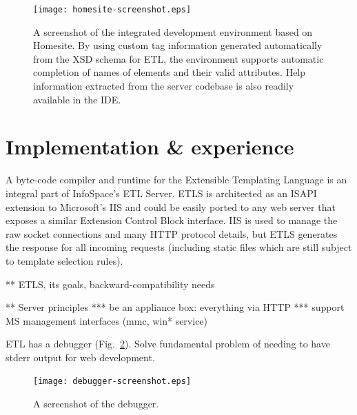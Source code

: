 \documentclass{www2003-submission}
\newcommand{\figref}[1]{Fig.~\ref{fig-#1}}
\begin{document}
\begin{figure}[tb]
\begin{centering}
\hspace*{-0.05\linewidth}\texttt{[image: homesite-screenshot.eps]}
\caption{A screenshot of the integrated development environment based
on Homesite.  By using custom tag information generated automatically
from the XSD schema for ETL, the environment supports automatic
completion of names of elements and their valid attributes.  Help
information extracted from the server codebase is also readily
available in the IDE\@.
\label{fig-homesite-screenshot}}
\end{centering}
\end{figure}


\section{Implementation \& experience}
\label{sec-implementation}

A byte-code compiler and runtime for the Extensible Templating Language is
an integral part of InfoSpace's ETL Server.  ETLS is architected as an
ISAPI extension to Microsoft's IIS and could be easily ported to any
web server that exposes a similar Extension Control Block interface.
IIS is used to manage the raw socket connections and many HTTP
protocol details, but ETLS generates the response for all incoming
requests (including static files which are still subject to template
selection rules).

** ETLS, its goals, backward-compatibility needs

** Server principles
*** be an appliance box: everything via HTTP
*** support MS management interfaces (mmc, win* service)

ETL has a debugger (\figref{debugger-screenshot}).  Solve fundamental
problem of needing to have stderr output for web development.


\begin{figure}[tb]
\begin{centering}
\hspace*{-0.03\linewidth}\texttt{[image: debugger-screenshot.eps]}
\caption{A screenshot of the debugger.
\label{fig-debugger-screenshot}}
\end{centering}
\end{figure}
\end{document}
